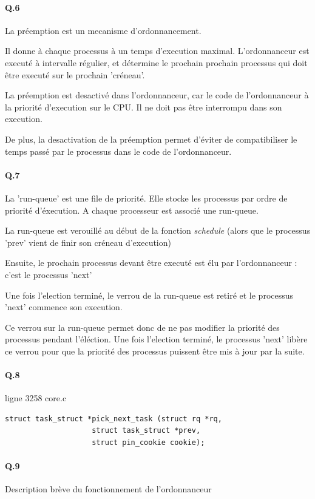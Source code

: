 \documentclass[10pt]{article}
\begin{document}
\paragraph{Q.6}
La préemption est un mecanisme d'ordonnancement.

Il donne à chaque processus à un temps d'execution maximal. \label{preempt}
L'ordonnanceur est executé à intervalle régulier, et détermine le prochain prochain
processus qui doit être executé sur le prochain 'créneau'.

La préemption est desactivé dans l'ordonnanceur, car le code de l'ordonnanceur à la priorité d'execution sur le CPU.
Il ne doit pas être interrompu dans son execution.

De plus, la desactivation de la préemption permet d'éviter de compatibiliser
le temps passé par le processus dans le code de l'ordonnanceur.

 \paragraph{Q.7}
 La 'run-queue' est une file de priorité. Elle stocke les processus par ordre de priorité d'éxecution.
 A chaque processeur est associé une run-queue.
 
 La run-queue est verouillé au début de la fonction \textit{schedule} (alors que le processus 'prev' vient de finir son créneau d'execution)
 
 Ensuite, le prochain processus devant être executé est élu par l'ordonnanceur : c'est le processus 'next'
 
 Une fois l'election terminé, le verrou de la run-queue est retiré et le processus 'next' commence son execution.
 
 Ce verrou sur la run-queue permet donc de ne pas modifier la priorité des processus pendant l'éléction.
 Une fois l'election terminé, le processus 'next' libère ce verrou pour que la priorité des processus puissent être mis à jour par la suite.
 
\paragraph{Q.8} ligne 3258 core.c
\lstset{language=C}
\begin{lstlisting}[frame=single]
struct task_struct *pick_next_task (struct rq *rq,
				    struct task_struct *prev,
				    struct pin_cookie cookie);
\end{lstlisting}

  \newpage
 \paragraph{Q.9}
    Description brève du fonctionnement de l'ordonnanceur
    
\end{document}
